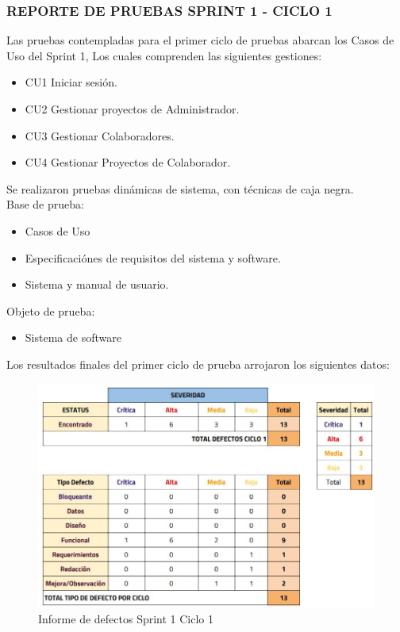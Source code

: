 \subsubsection{REPORTE DE PRUEBAS SPRINT 1 - CICLO 1}

Las pruebas contempladas para el primer ciclo de pruebas abarcan los Casos de Uso del Sprint 1, Los cuales comprenden las siguientes gestiones:

\begin{itemize}
	\item CU1 Iniciar sesión.
	\item CU2 Gestionar proyectos de Administrador.
	\item CU3 Gestionar Colaboradores.
	\item CU4 Gestionar Proyectos de Colaborador.
\end{itemize}

Se realizaron pruebas dinámicas de sistema, con técnicas de caja negra.\\

Base de prueba:
\begin{itemize}
	\item Casos de Uso
	\item Especificaciónes de requisitos del sistema y software.
	\item Sistema y manual de usuario.
\end{itemize}

Objeto de prueba:
\begin{itemize}
	\item Sistema de software
\end{itemize}

\newpage

Los resultados finales del primer ciclo de prueba arrojaron los siguientes datos:

\begin{figure}[H]
	\begin{center}
		\includegraphics[width=.95\textwidth]{images/pruebas/s1c1}
		\caption{Informe de defectos Sprint 1 Ciclo 1}
		\label{fig:infos1c1}
	\end{center}
\end{figure}


